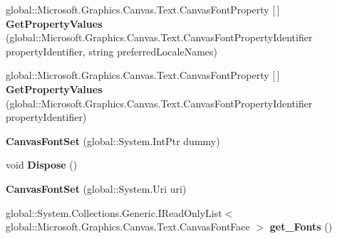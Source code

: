 \begin{DoxyCompactItemize}
\item 
\mbox{\label{class_microsoft_1_1_graphics_1_1_canvas_1_1_text_1_1_canvas_font_set_aa821ceb086ad0eb5aed484241b6bea7a}} 
global\+::\+Microsoft.\+Graphics.\+Canvas.\+Text.\+Canvas\+Font\+Property \mbox{[}$\,$\mbox{]} {\bfseries Get\+Property\+Values} (global\+::\+Microsoft.\+Graphics.\+Canvas.\+Text.\+Canvas\+Font\+Property\+Identifier property\+Identifier, string preferred\+Locale\+Names)
\item 
\mbox{\label{class_microsoft_1_1_graphics_1_1_canvas_1_1_text_1_1_canvas_font_set_ad5ad519ae1f152fedadf48d0d911f919}} 
global\+::\+Microsoft.\+Graphics.\+Canvas.\+Text.\+Canvas\+Font\+Property \mbox{[}$\,$\mbox{]} {\bfseries Get\+Property\+Values} (global\+::\+Microsoft.\+Graphics.\+Canvas.\+Text.\+Canvas\+Font\+Property\+Identifier property\+Identifier)
\item 
\mbox{\label{class_microsoft_1_1_graphics_1_1_canvas_1_1_text_1_1_canvas_font_set_aed5c881dc2a997f7281bf32d019b0d26}} 
{\bfseries Canvas\+Font\+Set} (global\+::\+System.\+Int\+Ptr dummy)
\item 
\mbox{\label{class_microsoft_1_1_graphics_1_1_canvas_1_1_text_1_1_canvas_font_set_a8f2287005fb2f87cc3459710f9266acc}} 
void {\bfseries Dispose} ()
\item 
\mbox{\label{class_microsoft_1_1_graphics_1_1_canvas_1_1_text_1_1_canvas_font_set_a1113ba1353deb4c7fe0e1a7dc51973da}} 
{\bfseries Canvas\+Font\+Set} (global\+::\+System.\+Uri uri)
\item 
\mbox{\label{class_microsoft_1_1_graphics_1_1_canvas_1_1_text_1_1_canvas_font_set_aefa89c8fcefa001d0d56c7165ffb79ac}} 
global\+::\+System.\+Collections.\+Generic.\+I\+Read\+Only\+List$<$ global\+::\+Microsoft.\+Graphics.\+Canvas.\+Text.\+Canvas\+Font\+Face $>$ {\bfseries get\+\_\+\+Fonts} ()
\item 
\mbox{\label{class_microsoft_1_1_graphics_1_1_canvas_1_1_text_1_1_canvas_font_set_a13e365d13ed355de227da7a3145714db}} 

\end{DoxyCompactItemize}
